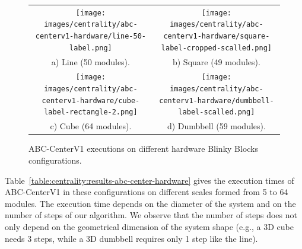 {
	
	\newcommand{\mySubfigureWidth}{200px}
	\newcommand{\mySubfigureHeight}{150px}
	
	\begin{figure}[h!]
		\centering			
		\small
		\begin{tabular}{c c}
			\texttt{[image: images/centrality/abc-centerv1-hardware/line-50-label.png]} & 	\texttt{[image: images/centrality/abc-centerv1-hardware/square-label-cropped-scalled.png]}\\
			a) Line (50 modules). & b) Square (49 modules).\\
			\texttt{[image: images/centrality/abc-centerv1-hardware/cube-label-rectangle-2.png]} &
			\texttt{[image: images/centrality/abc-centerv1-hardware/dumbbell-label-scalled.png]} \\
			c) Cube (64 modules). & d) Dumbbell (59 modules).\\
		\end{tabular}
		\caption{ABC-CenterV1 executions on different hardware Blinky Blocks configurations.\label{fig:centrality:abc-center-hardware}}
	\end{figure}
}

Table~\ref{table:centrality:results-abc-center-hardware} gives the execution times of ABC-CenterV1 in these configurations on different scales formed from 5 to 64 modules. The execution time depends on the diameter of the system and on the number of steps of our algorithm. We observe that the number of steps does not only depend on the geometrical dimension of the system shape (e.g., a 3D cube needs 3 steps, while a 3D dumbbell requires only 1 step like the line).

